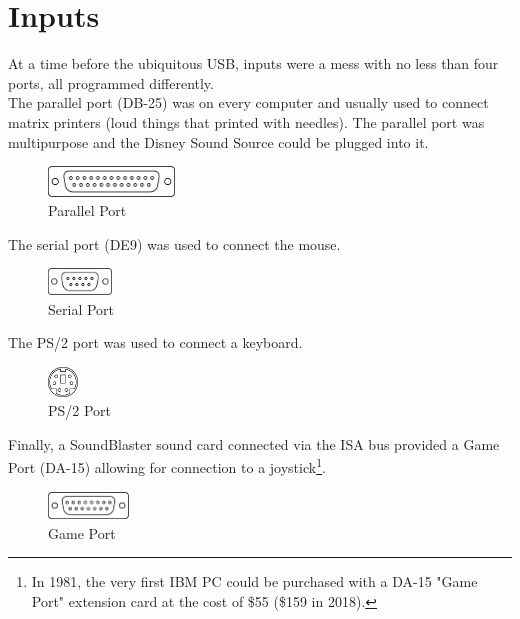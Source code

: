 \documentclass[book.tex]{subfiles}
\begin{document}
\section{Inputs}
At a time before the ubiquitous USB, inputs were a mess with no less than four ports, all programmed differently.\\

The parallel port (DB-25) was on every computer and usually used to connect matrix printers (loud things that printed with needles). The parallel port was multipurpose and the Disney Sound Source could be plugged into it.\\
\par
 \begin{figure}[H]
\centering
\includegraphics[width=0.3\textwidth]{imgs/drawings/ports/DB-25_parallel_port.eps}
\caption{Parallel Port}
\label{fig:parallelPort}
\end{figure}


The serial port (DE9) was used to connect the mouse.
 \begin{figure}[H]
\centering
\includegraphics[width=0.15\textwidth]{imgs/drawings/ports/DE9_serial_port.eps}
\caption{Serial Port}
\label{fig:serialPort}
\end{figure}

The PS/2 port was used to connect a keyboard.
 \begin{figure}[H]
\centering
\includegraphics[width=0.07\textwidth]{imgs/drawings/ports/MiniDIN-6_PS2.eps}
\caption{PS/2 Port}
\label{fig:ps2Port}
\end{figure}


Finally, a SoundBlaster sound card connected via the ISA bus provided a Game Port (DA-15) allowing for connection to a joystick\footnote{In 1981, the very first IBM PC could be purchased with a DA-15 "Game Port" extension card at the cost of \$55 (\$159 in 2018).}.
 \begin{figure}[H]
\centering
\includegraphics[width=0.19\textwidth]{imgs/drawings/ports/DA-15_GamePort.eps}
\caption{Game Port}
\label{fig:gamePort}
\end{figure}
\end{document}
